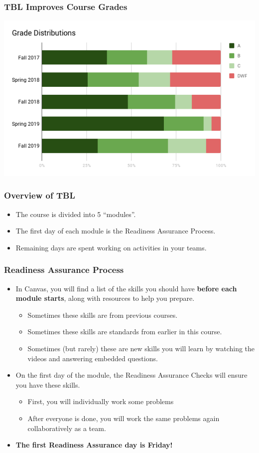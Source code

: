 \documentclass[aspectration=1610]{beamer}
\begin{document}
  
  \begin{frame}\frametitle{TBL Improves Course Grades}
  
  \begin{center}
  \includegraphics[scale=0.5]{grades.png}
  \end{center}
  \end{frame}
  
  \begin{frame}\frametitle{Overview of TBL}
  \begin{itemize}
  \item The course is divided into 5 ``modules''.
  \item The first day of each module is the Readiness Assurance Process.
  \item Remaining days are spent working on activities in your teams.
  \end{itemize}
  \end{frame}

  \begin{frame}\frametitle{Readiness Assurance Process}
  \begin{itemize}
  \item In Canvas, you will find a list of the skills you should have {\bf before each module starts}, along with resources to help you prepare.
  \begin{itemize}
  \item Sometimes these skills are from previous courses.
  \item Sometimes these skills are standards from earlier in this course.
    \item Sometimes (but rarely) these are new skills you will learn by watching the videos and answering embedded questions.
  \end{itemize}
  \pause \item On the first day of the module, the Readiness Assurance Checks will ensure you have these skills.
  \begin{itemize}
  \item First, you will individually work some problems
  \item After everyone is done, you will work the same problems again collaboratively as a team.
  \end{itemize}
  \item {\bf The first Readiness Assurance day is Friday!}
  \end{itemize}
  \end{frame}
  
\end{document}
